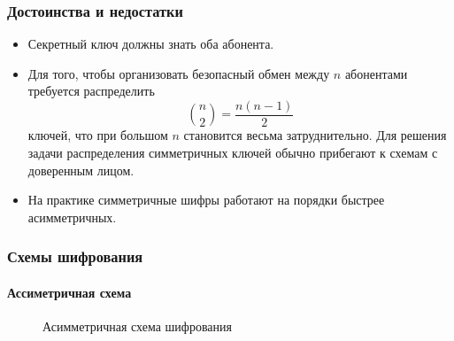 \begin{frame}
    \frametitle{Достоинства и недостатки}
    
    \begin{itemize}
        \item Секретный ключ должны знать оба абонента.
        \item Для того, чтобы организовать безопасный обмен между $n$ абонентами требуется распределить 
        \[\binom{n}{2}=\frac{n(n-1)}{2}\]
        ключей, что при большом $n$ становится весьма затруднительно. Для решения задачи распределения симметричных ключей обычно прибегают к схемам с \alert{доверенным} лицом.
        \item На практике симметричные шифры работают на порядки быстрее асимметричных.
    \end{itemize}
\end{frame}


\begin{frame}
    \frametitle{Схемы шифрования}
    \framesubtitle{Ассиметричная схема}
    \begin{figure}
        \begin{center}
        \end{center}
        \caption{Асимметричная схема шифрования}\label{pict:asymmcipher}
    \end{figure} 
\end{frame}



